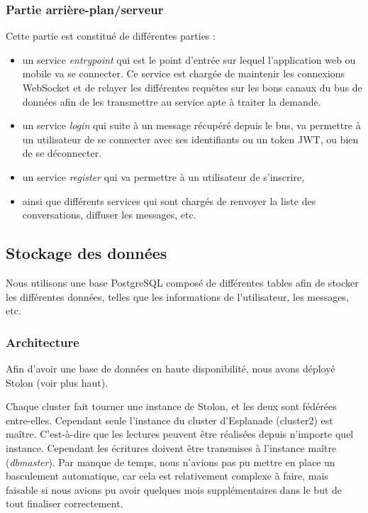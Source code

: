 \subsubsection{Partie arrière-plan/serveur}

Cette partie est constitué de différentes parties :

\begin{itemize}
\item
  un service \textit{entrypoint} qui est le point d'entrée sur lequel
  l'application web ou mobile va se connecter. Ce service est chargée de
  maintenir les connexions WebSocket et de relayer les différentes
  requêtes sur les bons canaux du bus de données afin de les transmettre
  au service apte à traiter la demande.
\item
  un service \textit{login} qui suite à un message récupéré depuis le bus,
  va permettre à un utilisateur de se connecter avec ses identifiants ou
  un token JWT, ou bien de se déconnecter.
\item
  un service \textit{register} qui va permettre à un utilisateur de
  s'inscrire,
\item
  ainsi que différents services qui sont chargés de renvoyer la liste
  des conversations, diffuser les messages, etc.
\end{itemize}

\subsection{Stockage des données}

Nous utilisons une base PostgreSQL composé de différentes tables afin de
stocker les différentes données, telles que les informations de
l'utilisateur, les messages, etc.


\subsubsection{Architecture}

Afin d'avoir une base de données en haute disponibilité, nous avons
déployé Stolon (voir plus haut).

Chaque cluster fait tourner une instance de Stolon, et les deux sont
fédérées entre-elles. Cependant seule l'instance du cluster d'Esplanade
(cluster2) est maître. C'est-à-dire que les lectures peuvent être
réalisées depuis n'importe quel instance. Cependant les écritures
doivent être transmises à l'instance maître (\textit{dbmaster}). Par
manque de temps, nous n'avions pas pu mettre en place un basculement
automatique, car cela est relativement complexe à faire, mais faisable
si nous avions pu avoir quelques mois supplémentaires dans le but de
tout finaliser correctement.

